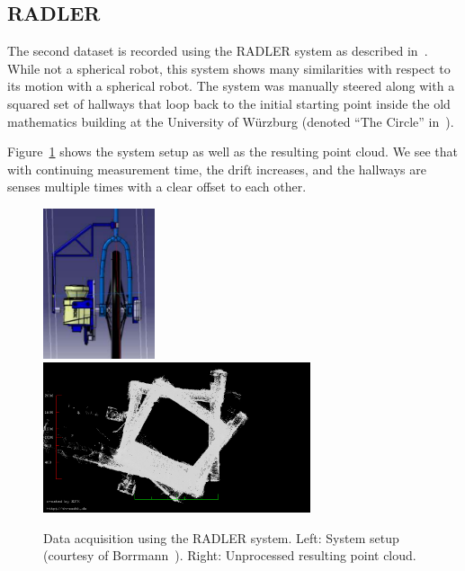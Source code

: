 \iffalse %
	\subsection{RADLER}

	The second dataset is recorded using the RADLER system as described in~\cite{Borrmann2020-RADLER}.
	While not a spherical robot, this system shows many similarities with respect to its motion with a spherical robot.
	The system was manually steered along with a squared set of hallways that loop back to the initial starting point inside the old mathematics building at the University of Würzburg (denoted ``The Circle'' in~\cite{Borrmann2020-RADLER}).

	Figure~\ref{fig:radler-mathe} shows the system setup as well as the resulting point cloud.
	We see that with continuing measurement time, the drift increases, and the hallways are senses multiple times with a clear offset to each other. 

	\begin{figure}
		\centering
		\begin{minipage}[c]{\textwidth}
			\includegraphics[width=0.2925\textwidth]{./images/radler_setup}\hfill
			\includegraphics[width=0.7\textwidth]{./images/mathe_top_view}
		\end{minipage}
		\caption{Data acquisition using the RADLER system. Left: System setup (courtesy of Borrmann~\cite{Borrmann2020-RADLER}). Right: Unprocessed resulting point cloud.}
		\label{fig:radler-mathe}
	\end{figure}

